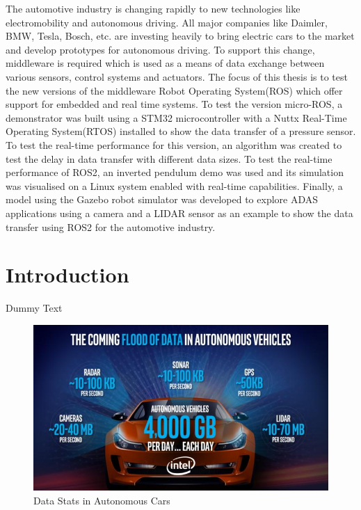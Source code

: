 \documentclass[%
xelatex,
	oneside,		%
	12pt,			%
	parskip=half,	%
	headsepline,	%
	footsepline,	%
	abstracton,
	chapterprefix=true%
    appendixprefix=true]
{scrreprt}
\begin{document}
The automotive industry is changing rapidly to new technologies like electromobility and autonomous driving. All major companies like Daimler, BMW, Tesla, Bosch, etc. are investing heavily to bring electric cars to the market and develop prototypes for autonomous driving. To support this change, middleware is required which is used as a means of data exchange between various sensors, control systems and actuators. The focus of this thesis is to test the new versions of the middleware Robot Operating System(ROS) which offer support for embedded and real time systems. To test the version micro-ROS, a demonstrator was built using a STM32 microcontroller with a Nuttx Real-Time Operating System(RTOS) installed to show the data transfer of a pressure sensor. To test the real-time performance for this version, an algorithm was created to test the delay in data transfer with different data sizes. To test the real-time performance of ROS2, an inverted pendulum demo was used and its simulation was visualised on a Linux system enabled with real-time capabilities. Finally, a model using the Gazebo robot simulator was developed to explore ADAS applications using a camera and a LIDAR sensor as an example to show the data transfer using ROS2 for the automotive industry.
\clearpage

	
	

\printnomenclature
	

	\tableofcontents
	\chapter{Introduction}
  Dummy Text 
\begin{figure}[ht]
\begin{center}
\includegraphics[scale=.5]{fig/autonomous-vehicle-data-intel-100697604-large.jpg}
\caption[Data Stats in Autonomous Cars]{Data Stats in Autonomous Cars\cite{dumm}}
\label{fig:dumm}
\end{center}
\end{figure}  
  
\end{document}
